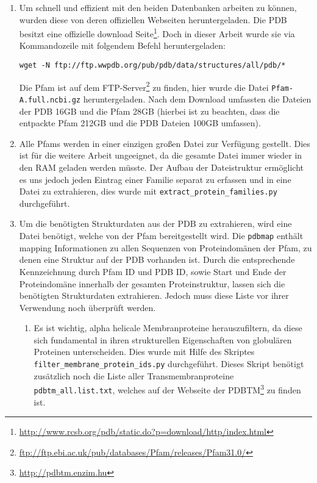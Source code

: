 \begin{enumerate}
\item
    \begin{sloppypar}
    Um schnell und effizient mit den beiden Datenbanken arbeiten zu können, wurden diese von deren offiziellen Webseiten heruntergeladen. Die \ac{PDB} besitzt eine offizielle download Seite\footnote{\url{http://www.rcsb.org/pdb/static.do?p=download/http/index.html}}. Doch in dieser Arbeit wurde sie via Kommandozeile mit folgendem Befehl heruntergeladen:
\begin{lstlisting}
wget -N ftp://ftp.wwpdb.org/pub/pdb/data/structures/all/pdb/*
\end{lstlisting}
    Die \ac{Pfam} ist auf dem FTP-Server\footnote{\url{ftp://ftp.ebi.ac.uk/pub/databases/Pfam/releases/Pfam31.0/}} zu finden, hier wurde die Datei \texttt{Pfam-A.full.ncbi.gz} heruntergeladen. Nach dem Download umfassten die Dateien der \ac{PDB} 16GB und die \ac{Pfam} 28GB (hierbei ist zu beachten, dass die entpackte \ac{Pfam} 212GB und die \ac{PDB} Dateien 100GB umfassen).
    \end{sloppypar}
\item
    Alle \ac{Pfams} werden in einer einzigen großen Datei zur Verfügung gestellt. Dies ist für die weitere Arbeit ungeeignet, da die gesamte Datei immer wieder in den \ac{RAM} geladen werden müsste. Der Aufbau der Dateistruktur ermöglicht es uns jedoch jeden Eintrag einer Familie separat zu erfassen und in eine Datei zu extrahieren, dies wurde mit \texttt{extract\_protein\_families.py} durchgeführt.
\item
    Um die benötigten Strukturdaten aus der PDB zu extrahieren, wird eine Datei benötigt, welche von der Pfam bereitgestellt wird. Die \texttt{pdbmap} enthält mapping Informationen zu allen Sequenzen von Proteindomänen der \ac{Pfam}, zu denen eine Struktur auf der \ac{PDB} vorhanden ist. Durch die entsprechende Kennzeichnung durch \ac{Pfam} ID und \ac{PDB} ID, sowie Start und Ende der Proteindomäne innerhalb der gesamten Proteinstruktur, lassen sich die benötigten Strukturdaten extrahieren. Jedoch muss diese Liste vor ihrer Verwendung noch überprüft werden.
    \begin{enumerate}
        \item 
        Es ist wichtig, alpha helicale Membranproteine herauszufiltern, da diese sich fundamental in ihren strukturellen Eigenschaften von globulären Proteinen unterscheiden. Dies wurde mit Hilfe des Skriptes \texttt{filter\_membrane\_protein\_ids.py} durchgeführt. Dieses Skript benötigt zusätzlich noch die Liste aller Transmembranproteine \texttt{pdbtm\_all.list.txt}, welches auf der Webseite der \ac{PDBTM}\footnote{\url{http://pdbtm.enzim.hu}} zu finden ist.

\end{enumerate}
\end{enumerate}
